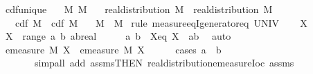 \documentclass[leqno]{article}
\theoremstyle{definition}
\begin{document}
\medskip

\begin{isabellebody}
\isamarkupfalse%
\ cdf{\isacharunderscore}unique{\isacharcolon}\isanewline
\ \ \ M{}\ M{}\isanewline
\ \ \ {\isachardoublequoteopen}real{\isacharunderscore}distribution\ M{}{\isachardoublequoteclose}\ \ {\isachardoublequoteopen}real{\isacharunderscore}distribution\ M{}{\isachardoublequoteclose}\isanewline
\ \ \ {\isachardoublequoteopen}cdf\ M{}\ {\isacharequal}\ cdf\ M{}{\isachardoublequoteclose}\isanewline
\ \ \ {\isachardoublequoteopen}M{}\ {\isacharequal}\ M{}{\isachardoublequoteclose}\isanewline
{}\isamarkupfalse%
\ {\isacharparenleft}rule\ measure{\isacharunderscore}eqI{\isacharunderscore}generator{\isacharunderscore}eq{\isacharbrackleft}\ {\isasymOmega}{\isacharequal}UNIV{\isacharbrackright}{\isacharparenright}\isanewline
\ \ \isamarkupfalse%
\ X\ \isamarkupfalse%
\ {\isachardoublequoteopen}X\ {\isasymin}\ range\ {\isacharparenleft}{\isasymlambda}{\isacharparenleft}a{\isacharcomma}\ b{\isacharparenright}{\isachardot}\ {\isacharbraceleft}a{\isacharless}{\isachardot}{\isachardot}b{\isacharcolon}{\isacharcolon}real{\isacharbraceright}{\isacharparenright}{\isachardoublequoteclose}\isanewline
\ \ \isamarkupfalse%
\ \isamarkupfalse%
\ a\ b\ \ Xeq{\isacharcolon}\ {\isachardoublequoteopen}X\ {\isacharequal}\ {\isacharbraceleft}a{\isacharless}{\isachardot}{\isachardot}b{\isacharbraceright}{\isachardoublequoteclose}\ \isamarkupfalse%
\ auto\isanewline
\ \ \isamarkupfalse%
\ \isamarkupfalse%
\ {\isachardoublequoteopen}emeasure\ M{}\ X\ {\isacharequal}\ emeasure\ M{}\ X{\isachardoublequoteclose}\isanewline
\ \ \ \ \isamarkupfalse%
\ {\isacharparenleft}cases\ {\isachardoublequoteopen}a\ {\isasymle}\ b{\isachardoublequoteclose}{\isacharparenright}\isanewline
\ \ \ \ \ \ \ {\isacharparenleft}simp{\isacharunderscore}all\ add{\isacharcolon}\ assms{\isacharparenleft}{}{\isacharcomma}{}{\isacharparenright}{\isacharbrackleft}THEN\ real{\isacharunderscore}distribution{\isachardot}emeasure{\isacharunderscore}Ioc{\isacharbrackright}\ assms{\isacharparenleft}{}{\isacharparenright}{\isacharparenright}\isanewline
{}\isamarkupfalse%

\end{isabellebody}
\end{document}

